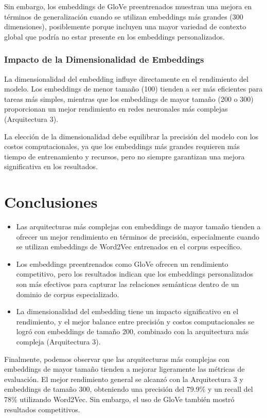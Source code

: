 \documentclass[a4]{article}
\begin{document}
Sin embargo, los embeddings de GloVe preentrenados muestran una mejora en términos de generalización cuando se utilizan embeddings más grandes (300 dimensiones), posiblemente porque incluyen una mayor variedad de contexto global que podría no estar presente en los embeddings personalizados.

\subsubsection{Impacto de la Dimensionalidad de Embeddings}

La dimensionalidad del embedding influye directamente en el rendimiento del modelo. Los embeddings de menor tamaño (100) tienden a ser más eficientes para tareas más simples, mientras que los embeddings de mayor tamaño (200 o 300) proporcionan un mejor rendimiento en redes neuronales más complejas (Arquitectura 3).

La elección de la dimensionalidad debe equilibrar la precisión del modelo con los costos computacionales, ya que los embeddings más grandes requieren más tiempo de entrenamiento y recursos, pero no siempre garantizan una mejora significativa en los resultados.

\section{Conclusiones}

\begin{itemize}
    \item Las arquitecturas más complejas con embeddings de mayor tamaño tienden a ofrecer un mejor rendimiento en términos de precisión, especialmente cuando se utilizan embeddings de Word2Vec entrenados en el corpus específico.
    \item Los embeddings preentrenados como GloVe ofrecen un rendimiento competitivo, pero los resultados indican que los embeddings personalizados son más efectivos para capturar las relaciones semánticas dentro de un dominio de corpus especializado.
    \item La dimensionalidad del embedding tiene un impacto significativo en el rendimiento, y el mejor balance entre precisión y costos computacionales se logró con embeddings de tamaño 200, combinado con la arquitectura más compleja (Arquitectura 3).
\end{itemize}

Finalmente, podemos observar que las arquitecturas más complejas con embeddings de mayor tamaño tienden a mejorar ligeramente las métricas de evaluación. El mejor rendimiento general se alcanzó con la Arquitectura 3 y embeddings de tamaño 300, obteniendo una precisión del 79.9\% y un recall del 78\% utilizando Word2Vec. Sin embargo, el uso de GloVe también mostró resultados competitivos.
\end{document}
